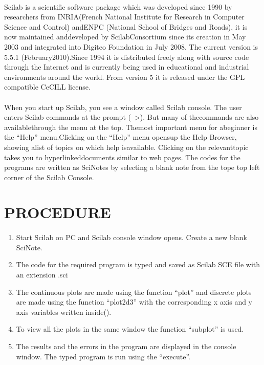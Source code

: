 \paragraph{}

Scilab is a scientific software package which was developed since 1990 by researchers from INRIA(French National Institute for Research in Computer Science and Control) andENPC (National School of Bridges and Roads), it is now maintained anddeveloped by ScilabConsortium since its creation in May 2003 and integrated into Digiteo Foundation in July 2008. The current version is 5.5.1 (February2010).Since 1994 it is distributed freely along with source code through the Internet and is currently being used in educational and industrial environments around the world. From version 5 it is released under the GPL compatible CeCILL license.
\paragraph{}

When you start up Scilab, you see a window called Scilab console. The user enters Scilab commands at the prompt (-->). But many of thecommands are also availablethrough the menu at the top. Themost important menu for abeginner is the “Help” menu.Clicking on the “Help” menu opensup the Help Browser, showing alist of topics on which help isavailable. Clicking on the relevanttopic takes you to hyperlinkeddocuments similar to web pages. The codes for the programs are written as SciNotes by selecting a blank note from the tope top left corner of the Scilab Console.

\section*{PROCEDURE}

\paragraph{}
\begin{enumerate}
\item
Start Scilab on PC and Scilab console window opens. Create a new blank SciNote.
\item
The code for the required program is typed and saved as Scilab SCE file with an extension .sci
\item

The continuous plots are made using the function “plot” and discrete plots are made using the function “plot2d3” with the corresponding x axis and y axis variables written inside().

\item
To view all the plots in the same window the function “subplot” is used.
\item
The results and the errors in the program are displayed in the console window.
The typed program is run using the “execute”.
\end{enumerate}

